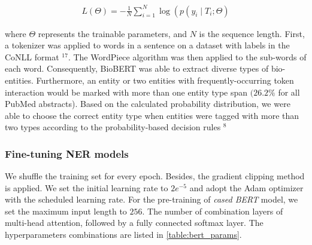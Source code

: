 \begin{align}
    L(\Theta)=-\frac{1}{N} \sum_{i=1}^{N} \log \left(p\left(y_{i} \mid T_{i} ; \Theta\right)\right.
\end{align}

\hspace*{3.5mm} where $\Theta$ represents the trainable parameters, and $N$ is the sequence length. First, a tokenizer was applied to words in a sentence on a dataset with labels in the CoNLL format $^{17}$. The WordPiece algorithm was then applied to the sub-words of each word. Consequently, BioBERT was able to extract diverse types of bio-entities. Furthermore, an entity or two entities with frequently-occurring token interaction would be marked with more than one entity type span $(26.2 \%$ for all PubMed abstracts). Based on the calculated probability distribution, we were able to choose the correct entity type when entities were tagged with more than two types according to the probability-based decision rules $^{8}$

\subsubsection{Fine-tuning NER models}
We shuffle the training set for every epoch. Besides, the gradient clipping method is applied. We set the initial learning rate to $2 e^{-5}$ and adopt the Adam optimizer with the scheduled learning rate. For the pre-training of \textit{cased BERT} model, we set the maximum input length to $256$. The number of combination layers of multi-head attention, followed by a fully connected softmax layer. The hyperparameters combinations are listed in  \cref{table:bert_params}. 

